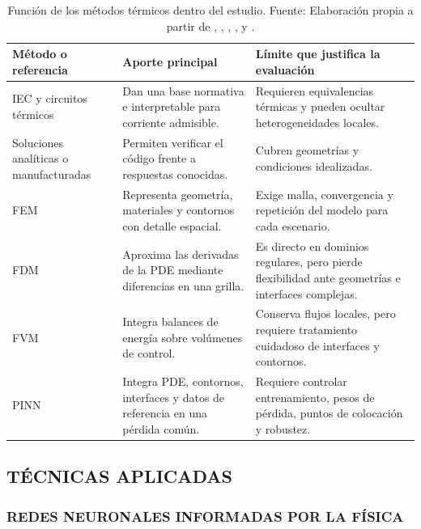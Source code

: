 \documentclass[11pt,a4paper,oneside]{report}
\renewcommand{\arraystretch}{1.18}
\begin{document}
\begin{table}[htbp]
\centering
\caption{Función de los métodos térmicos dentro del estudio. Fuente: Elaboración propia a partir de \textcite{iec60287}, \textcite{iec60853}, \textcite[4--6]{enescu2021}, \textcite[3--4,93--99]{cigre2025}, \textcite{patankar1980numerical} y \textcite{raissi2019}.}
\label{tab:metodos-calculo-termico}
\begingroup
\footnotesize
\setlength{\tabcolsep}{3pt}
\renewcommand{\arraystretch}{1.25}
\begin{tabularx}{\textwidth}{L{3.1cm}Y Y}
\toprule
\textbf{Método o referencia} & \textbf{Aporte principal} & \textbf{Límite que justifica la evaluación} \\
\midrule
IEC y circuitos térmicos & Dan una base normativa e interpretable para corriente admisible. & Requieren equivalencias térmicas y pueden ocultar heterogeneidades locales. \\
Soluciones analíticas o manufacturadas & Permiten verificar el código frente a respuestas conocidas. & Cubren geometrías y condiciones idealizadas. \\
FEM & Representa geometría, materiales y contornos con detalle espacial. & Exige malla, convergencia y repetición del modelo para cada escenario. \\
FDM & Aproxima las derivadas de la PDE mediante diferencias en una grilla. & Es directo en dominios regulares, pero pierde flexibilidad ante geometrías e interfaces complejas. \\
FVM & Integra balances de energía sobre volúmenes de control. & Conserva flujos locales, pero requiere tratamiento cuidadoso de interfaces y contornos. \\
PINN & Integra PDE, contornos, interfaces y datos de referencia en una pérdida común. & Requiere controlar entrenamiento, pesos de pérdida, puntos de colocación y robustez. \\
\bottomrule
\end{tabularx}
\endgroup
\end{table}

\subsection{TÉCNICAS APLICADAS}
\label{sec:tecnicas-aplicadas}

\subsubsection{REDES NEURONALES INFORMADAS POR LA FÍSICA}
\label{subsec:pinn}
\end{document}
